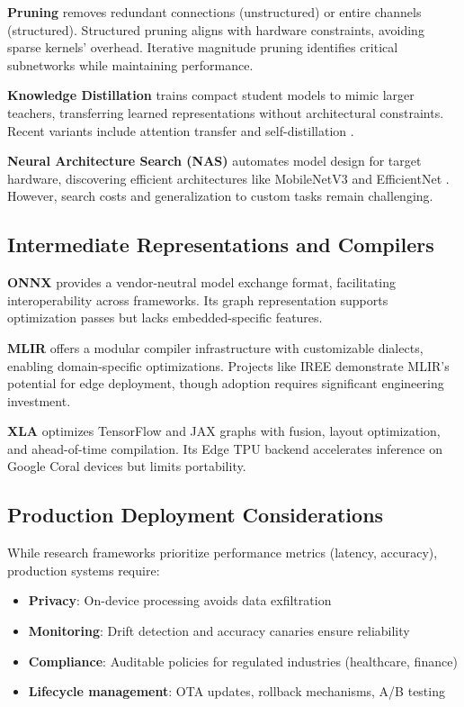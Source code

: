 \textbf{Pruning} removes redundant connections (unstructured) or entire channels (structured). Structured pruning \cite{structured-pruning} aligns with hardware constraints, avoiding sparse kernels' overhead. Iterative magnitude pruning \cite{lottery-ticket} identifies critical subnetworks while maintaining performance.

\textbf{Knowledge Distillation} \cite{distillation} trains compact student models to mimic larger teachers, transferring learned representations without architectural constraints. Recent variants include attention transfer \cite{attention-transfer} and self-distillation \cite{self-distillation}.

\textbf{Neural Architecture Search (NAS)} \cite{nas} automates model design for target hardware, discovering efficient architectures like MobileNetV3 \cite{mobilenetv3} and EfficientNet \cite{efficientnet}. However, search costs and generalization to custom tasks remain challenging.

\subsection{Intermediate Representations and Compilers}

\textbf{ONNX} \cite{onnx} provides a vendor-neutral model exchange format, facilitating interoperability across frameworks. Its graph representation supports optimization passes but lacks embedded-specific features.

\textbf{MLIR} \cite{mlir} offers a modular compiler infrastructure with customizable dialects, enabling domain-specific optimizations. Projects like IREE \cite{iree} demonstrate MLIR's potential for edge deployment, though adoption requires significant engineering investment.

\textbf{XLA} \cite{xla} optimizes TensorFlow and JAX graphs with fusion, layout optimization, and ahead-of-time compilation. Its Edge TPU backend accelerates inference on Google Coral devices but limits portability.

\subsection{Production Deployment Considerations}

While research frameworks prioritize performance metrics (latency, accuracy), production systems require:
\begin{itemize}
\item \textbf{Privacy}: On-device processing avoids data exfiltration \cite{federated-learning}
\item \textbf{Monitoring}: Drift detection and accuracy canaries ensure reliability \cite{ml-monitoring}
\item \textbf{Compliance}: Auditable policies for regulated industries (healthcare, finance)
\item \textbf{Lifecycle management}: OTA updates, rollback mechanisms, A/B testing
\end{itemize}

